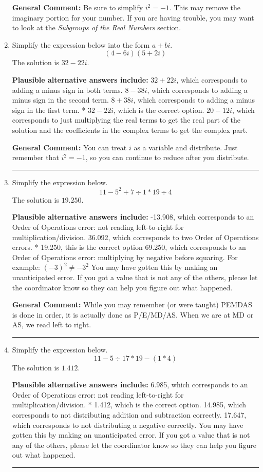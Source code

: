 \documentclass{extbook}[14pt]
\newcommand{\litem}[1]{\item #1

\rule{\textwidth}{0.4pt}}
\begin{document}
\begin{enumerate}
{\textbf{General Comment:} Be sure to simplify $i^2 = -1$. This may remove the imaginary portion for your number. If you are having trouble, you may want to look at the \textit{Subgroups of the Real Numbers} section.
}
\litem{
Simplify the expression below into the form $a+bi$.
\[ (4 - 6 i)(5 + 2 i) \]The solution is \( 32 - 22 i \).\begin{enumerate}[label=\Alph*.]
\textbf{Plausible alternative answers include:} $32 + 22 i$, which corresponds to adding a minus sign in both terms.
 $8 - 38 i$, which corresponds to adding a minus sign in the second term.
 $8 + 38 i$, which corresponds to adding a minus sign in the first term.
* $32 - 22 i$, which is the correct option.
 $20 - 12 i$, which corresponds to just multiplying the real terms to get the real part of the solution and the coefficients in the complex terms to get the complex part.
\end{enumerate}

\textbf{General Comment:} You can treat $i$ as a variable and distribute. Just remember that $i^2=-1$, so you can continue to reduce after you distribute.
}
\litem{
Simplify the expression below.
\[ 11 - 5^2 + 7 \div 1 * 19 \div 4 \]The solution is \( 19.250 \).\begin{enumerate}[label=\Alph*.]
\textbf{Plausible alternative answers include:} -13.908, which corresponds to an Order of Operations error: not reading left-to-right for multiplication/division.
 36.092, which corresponds to two Order of Operations errors.
* 19.250, this is the correct option
 69.250, which corresponds to an Order of Operations error: multiplying by negative before squaring. For example: $(-3)^2 \neq -3^2$
 You may have gotten this by making an unanticipated error. If you got a value that is not any of the others, please let the coordinator know so they can help you figure out what happened.
\end{enumerate}

\textbf{General Comment:} While you may remember (or were taught) PEMDAS is done in order, it is actually done as P/E/MD/AS. When we are at MD or AS, we read left to right.
}
\litem{
Simplify the expression below.
\[ 11 - 5 \div 17 * 19 - (1 * 4) \]The solution is \( 1.412 \).\begin{enumerate}[label=\Alph*.]
\textbf{Plausible alternative answers include:} 6.985, which corresponds to an Order of Operations error: not reading left-to-right for multiplication/division.
* 1.412, which is the correct option.
 14.985, which corresponds to not distributing addition and subtraction correctly.
 17.647, which corresponds to not distributing a negative correctly.
 You may have gotten this by making an unanticipated error. If you got a value that is not any of the others, please let the coordinator know so they can help you figure out what happened.
\end{enumerate}

}
\end{enumerate}
\end{document}
